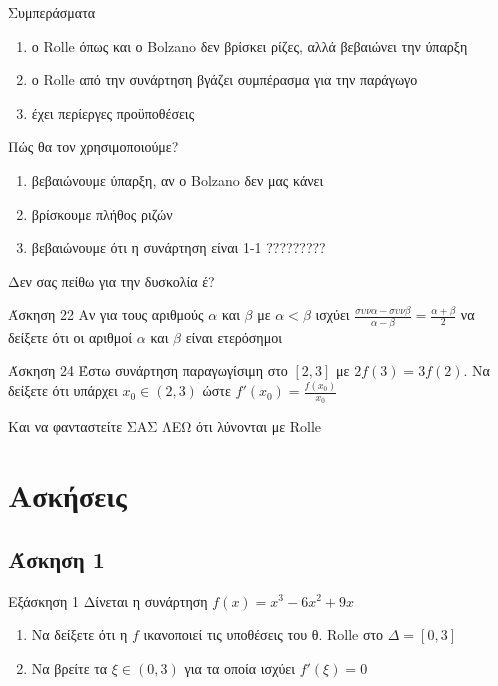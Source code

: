 \documentclass[greek]{beamer}
\begin{document}
\begin{frame}{Συμπεράσματα}
 \begin{enumerate}
  \item<1-> ο Rolle όπως και ο Bolzano δεν βρίσκει ρίζες, αλλά βεβαιώνει την ύπαρξη
  \item<2-> ο Rolle από την συνάρτηση βγάζει συμπέρασμα για την παράγωγο
  \item<3-> έχει περίεργες προϋποθέσεις
 \end{enumerate}
\end{frame}

\begin{frame}{Πώς θα τον χρησιμοποιούμε?}
 \begin{enumerate}
  \item<1-> βεβαιώνουμε ύπαρξη, αν ο Bolzano δεν μας κάνει
  \item<2-> βρίσκουμε πλήθος ριζών
  \item<3-> βεβαιώνουμε ότι η συνάρτηση είναι 1-1 ?????????
 \end{enumerate}
\end{frame}

\begin{frame}{Δεν σας πείθω για την δυσκολία έ?}
 \begin{block}{Άσκηση 22}
  Αν για τους αριθμούς $α$ και $β$ με $α<β$ ισχύει $\frac{συνα-συνβ}{α-β}=\frac{α+β}{2}$ να δείξετε ότι οι αριθμοί $α$ και $β$ είναι ετερόσημοι
 \end{block}
 \begin{block}{Άσκηση 24}
  Έστω συνάρτηση παραγωγίσιμη στο $[2,3]$ με $2f(3)=3f(2)$. Να δείξετε ότι υπάρχει $x_0\in (2,3)$ ώστε $f'(x_0)=\frac{f(x_0)}{x_0}$
 \end{block}
  Και να φανταστείτε ΣΑΣ ΛΕΩ ότι λύνονται με Rolle
\end{frame}

\section{Ασκήσεις}
\subsection{Άσκηση 1}
\begin{frame}[label=Άσκηση1]{Εξάσκηση 1}
 Δίνεται η συνάρτηση $f(x)=x^3-6x^2+9x$
 \begin{enumerate}
  \item<1-> Να δείξετε ότι η $f$ ικανοποιεί τις υποθέσεις του θ. Rolle στο $Δ=[0,3]$
  \item<2-> Να βρείτε τα $ξ\in(0,3)$ για τα οποία ισχύει $f'(ξ)=0$
 \end{enumerate}
\end{frame}
\end{document}
